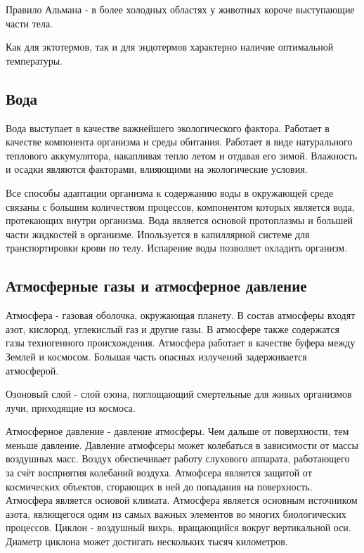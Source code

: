 Правило Альмана - в более холодных областях у животных короче выступающие части тела.

Как для эктотермов, так и для эндотермов характерно наличие оптимальной температуры.

\subsection{Вода}
Вода выступает в качестве важнейшего экологического фактора. Работает в качестве компонента организма и среды обитания. Работает в виде натурального теплового аккумулятора, накапливая тепло летом и отдавая его зимой. Влажность и осадки являются факторами, влияющими на экологические условия. 

Все способы адаптации организма к содержанию воды в окружающей среде связаны с большим количеством процессов, компонентом которых является вода, протекающих внутри организма. Вода является основой протоплазмы и большей части жидкостей в организме. Ипользуется в капиллярной системе для транспортировки крови по телу. Испарение воды позволяет охладить организм. 

\subsection{Атмосферные газы и атмосферное давление}

Атмосфера - газовая оболочка, окружающая планету. В состав атмосферы входят азот, кислород, углекислый газ и другие газы. В атмосфере также содержатся газы техногенного происхождения. Атмосфера работает в качестве буфера между Землей и космосом. Большая часть опасных излучений задерживается атмосферой. 

Озоновый слой - слой озона, поглощающий смертельные для живых организмов лучи, приходящие из космоса.

Атмосферное давление - давление атмосферы. Чем дальше от поверхности, тем меньше давление. Давление атмофсеры может колебаться в зависимости от массы воздушных масс. Воздух обеспечивает работу слухового аппарата, работающего за счёт восприятия колебаний воздуха. Атмофсера является защитой от космических объектов, сгорающих в ней до попадания на поверхность. Атмосфера является основой климата. Атмосфера является основным источником азота, явлющегося однм из самых важных элементов во многих биологических процессов. Циклон - воздушный вихрь, вращающийся вокруг вертикальной оси. Диаметр циклона может достигать нескольких тысяч километров.